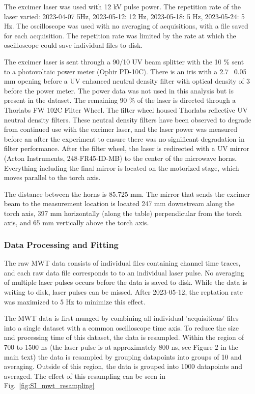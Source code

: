 The excimer laser was used with 12 kV pulse power. The repetition rate of the laser varied: 2023-04-07 5Hz, 2023-05-12: 12 Hz, 2023-05-18: 5 Hz, 2023-05-24: 5 Hz. The oscilloscope was used with no averaging of acquisitions, with a file saved for each acquisition. The repetition rate was limited by the rate at which the oscilloscope could save individual files to disk. 

The excimer laser is sent through a 90/10 UV beam splitter with the 10 \% sent to a photovoltaic power meter (Ophir PD-10C). There is an iris with a 2.7 \pm\ 0.05 mm opening before a UV enhanced neutral density filter with optical density of 3 before the power meter. The power data was not used in this analysis but is present in the dataset. The remaining 90 \% of the laser is directed through a Thorlabs FW 102C Filter Wheel. The filter wheel housed Thorlabs reflective UV neutral density filters. These neutral density filters have been observed to degrade from continued use with the excimer laser, and the laser power was measured before an after the experiment to ensure there was no significant degradation in filter performance. After the filter wheel, the laser is redirected with a UV mirror (Acton Instruments, 248-FR45-ID-MB) to the center of the microwave horns. Everything including the final mirror is located on the motorized stage, which moves parallel to the torch axis.  

The distance between the horns is 85.725 mm. The mirror that sends the excimer beam to the measurement location is located 247 mm downstream along the torch axis, 397 mm horizontally (along the table) perpendicular from the torch axis, and 65 mm vertically above the torch axis. 


\subsubsection{Data Processing and Fitting}

The raw MWT data consists of individual files containing channel time traces, and each raw data file corresponds to to an individual laser pulse. No averaging of multiple laser pulses occurs before the data is saved to disk. While the data is writing to disk, laser pulses can be missed. After 2023-05-12, the reptation rate was maximized to 5 Hz to minimize this effect. 

The MWT data is first munged by combining all individual 'acquisitions' files into a single dataset with a common oscilloscope time axis. To reduce the size and processing time of this dataset, the data is resampled. Within the region of 700 to 1500 ns (the laser pulse is at approximately 800 ns, see Figure 2 in the main text) the data is resampled by grouping datapoints into groups of 10 and averaging. Outside of this region, the data is grouped into 1000 datapoints and averaged. The effect of this resampling can be seen in Fig.\ \ref{fig:SI_mwt_resampling}

